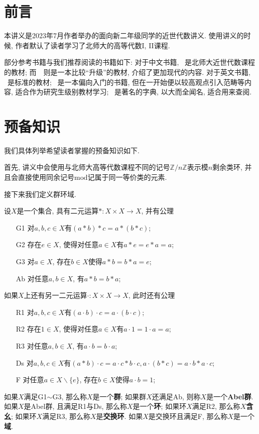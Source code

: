 \chapter{前言}

本讲义是2023年7月作者举办的面向新二年级同学的近世代数讲义.
使用讲义的时候, 作者默认了读者学习了北师大的高等代数I, II课程.

部分参考书籍与我们推荐阅读的书籍如下:
对于中文书籍, \parencite{BNU}~是北师大近世代数课程的教材; 而~\parencite{wwli}~则是一本比较``升级''的教材, 介绍了更加现代的内容.
对于英文书籍, \parencite{Hungerford}~是标准的教材;
\parencite{Chapter0}~是一本偏向入门的书籍, 但在一开始便以较高观点引入范畴等内容, 适合作为研究生级别教材学习;
\parencite{Lang}~是著名的字典, 以大而全闻名, 适合用来查阅.

\chapter{预备知识}

我们具体列举希望读者掌握的预备知识如下.

首先, 讲义中会使用与北师大高等代数课程不同的记号$\mathbb{Z}/n\mathbb{Z}$表示模$n$剩余类环, 并且会直接使用同余记号$\mathrm{mod}$记属于同一等价类的元素.

接下来我们定义群环域.
\begin{defn}设$X$是一个集合, 具有二元运算$*:X\times X\to X$, 并有公理
    \begin{itemize}
        \item[G1] 对$a,b,c\in X$有$(a*b)*c=a*(b*c)$;
        \item[G2] 存在$e\in X$, 使得对任意$a\in X$有$a*e=e*a=a$;
        \item[G3] 对$a\in X$, 存在$b\in X$使得$a*b=b*a=e$;
        \item[Ab] 对任意$a,b\in X$, 有$a*b=b*a$;
    \end{itemize}
    如果$X$上还有另一二元运算$\cdot:X\times X\to X$, 此时还有公理
    \begin{itemize}
        \item[R1] 对$a,b,c\in X$有$(a\cdot b)\cdot c=a\cdot(b\cdot c)$;
        \item[R2] 存在$1\in X$, 使得对任意$a\in X$有$a\cdot 1=1\cdot a=a$;
        \item[R3] 对任意$a,b\in X$, 有$a\cdot b=b\cdot a$;
        \item[Ds] 对$a,b,c\in X$有$(a*b)\cdot c=a\cdot c*b\cdot c, a\cdot(b*c)=a\cdot b*a\cdot c$;
        \item[F] 对任意$a\in X\backslash\{e\}$, 存在$b\in X$使得$a\cdot b=1$;
    \end{itemize}
    如果$X$满足G1$\sim$G3, 那么称$X$是一个\textbf{群}; 如果群$X$还满足Ab, 则称$X$是一个\textbf{Abel群}.
    如果$X$是Abel群, 且满足R1与Ds, 那么称$X$是一个\textbf{环}; 如果环$X$满足R2, 那么称$X$\textbf{含幺}; 如果环$X$满足R3, 那么称$X$是\textbf{交换环}.
    如果$X$是交换环且满足F, 那么称$X$是一个\textbf{域}.
\end{defn}

